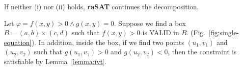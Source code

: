 \documentclass[runningheads,a4paper,oribibl]{llncs}
\newcommand{\suppress}[1]{} %
\begin{document}
\suppress{
\begin{proof}
\begin{enumerate}[(i)]
\item If $l_g > 0$ or $h_g < 0$, then $g=0$ cannot be satisfied in box $I$.
  As a result, $F$ is UNSAT in $I$. 
\item If there are two instances $\vec{t},\vec{t'}$ in the box with
  $g(\vec{t}) > 0$ and $g(\vec{t'}) < 0$, it is clear from the Intermediate
  Value Theorem that there exist one point $\vec{t_0}$ between $\vec{t}$ and
  $\vec{t'}$ such that $g(\vec{t_0}) = 0$. In addition, because
  $\bigwedge \limits_{j}^m f_j > 0$ is IA-VALID in $I$, $\vec{t_0}$ also
  satisfies $\bigwedge \limits_{j}^m f_j > 0$.
  As a result, $F$ is satisfiable with $\vec{t_0}$ as the SAT instance.
\end{enumerate}
\end{proof}
}
If neither (i) nor (ii) holds, \textbf{raSAT} continues the decomposition.
\begin{example}
  Let $\varphi = f(x, y) > 0 \wedge g(x, y) = 0$.
  Suppose we find a box 
  ${B = (a, b) \times (c, d)}$
  such that $f(x, y) > 0$ is VALID in $B$.
  (Fig.~\ref{fig:single-equation}).
  In addition, inside the box,
  if we find two points $(u_1, v_1)$ and $(u_2, v_2)$ such that
  $g(u_1, v_1) > 0$ and $g(u_2, v_2) < 0$,
  then the constraint is satisfiable by Lemma~\ref{lemma:ivt}. 
\end{example}
\end{document}
